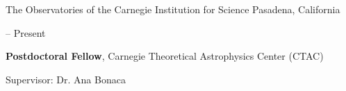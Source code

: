 \documentclass[cv.tex]{subfiles}
\begin{document}
{\color{themecolor} \large
The Observatories of the Carnegie Institution for Science
}
\hfill
Pasadena, California
\par\noindent
\parbox{0.18\textwidth}{%
	 -- Present \par
	\null
}
\hspace{1mm}
\parbox{0.8\textwidth}{%
	\vspace{1mm}
	\textbf{Postdoctoral Fellow}, Carnegie Theoretical Astrophysics Center 
	(CTAC) \par
	Supervisor: Dr. Ana Bonaca
}
\end{document}
